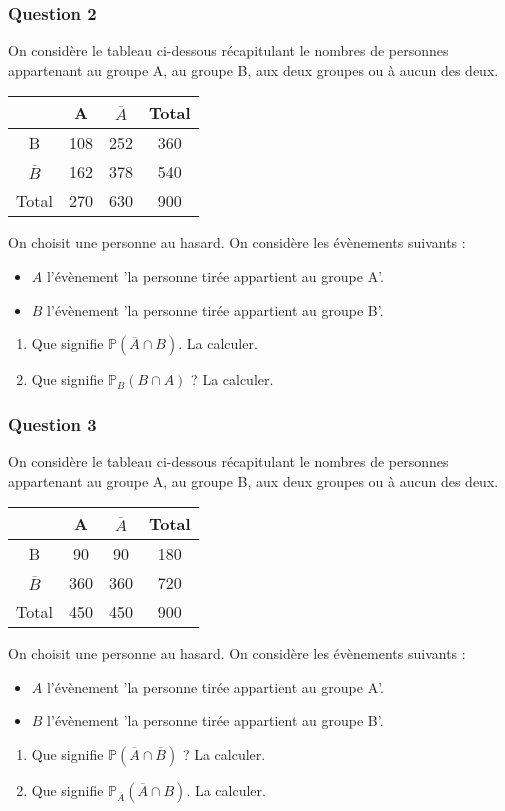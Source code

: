 \documentclass[15pt, mathserif]{beamer}
\begin{document}
\begin{frame} 
	\frametitle{Question 2}
On considère le tableau ci-dessous récapitulant le nombres de personnes appartenant au groupe A, au groupe B, aux deux groupes ou à aucun des deux.\begin{center} 
 \begin{tabular}{|c|c|c|c|} 
 \cline{2-4} 
 \multicolumn{1}{c|}{} & A & $\overline{A}$ & Total \\\hline 
 B   &108  &252& 360 \\\hline 
 $\overline{B}$   &162 & 378 & 540 \\\hline 
 Total   &270&630 &900 \\\hline  
 \end{tabular} 
 \end{center} On choisit une personne au hasard. On considère les évènements suivants : 
 \begin{itemize} 
 \item $A$ l'évènement 'la personne tirée appartient au groupe A'. 
 \item $B$ l'évènement 'la personne tirée appartient au groupe B'. 
 \end{itemize} 
 \begin{enumerate} 
 \item Que signifie $\mathbb{P}(\overline{A} \cap B)$. La calculer. 
 \item Que signifie $\mathbb{P}_{B} (B \cap A)$ ? La calculer. 
  \end{enumerate} 
 \end{frame}


\begin{frame} 
	\frametitle{Question 3}
On considère le tableau ci-dessous récapitulant le nombres de personnes appartenant au groupe A, au groupe B, aux deux groupes ou à aucun des deux.\begin{center} 
 \begin{tabular}{|c|c|c|c|} 
 \cline{2-4} 
 \multicolumn{1}{c|}{} & A & $\overline{A}$ & Total \\\hline 
 B   &90  &90& 180 \\\hline 
 $\overline{B}$   &360 & 360 & 720 \\\hline 
 Total   &450&450 &900 \\\hline  
 \end{tabular} 
 \end{center} On choisit une personne au hasard. On considère les évènements suivants : 
 \begin{itemize} 
 \item $A$ l'évènement 'la personne tirée appartient au groupe A'. 
 \item $B$ l'évènement 'la personne tirée appartient au groupe B'. 
 \end{itemize} 
 \begin{enumerate} 
 \item Que signifie $\mathbb{P}(\overline{A} \cap \overline{B})$ ? La calculer. 
 \item Que signifie $\mathbb{P}_{\overline{A}} (\overline{A} \cap B)$. La calculer. 
  \end{enumerate} 
 \end{frame}
\end{document}
